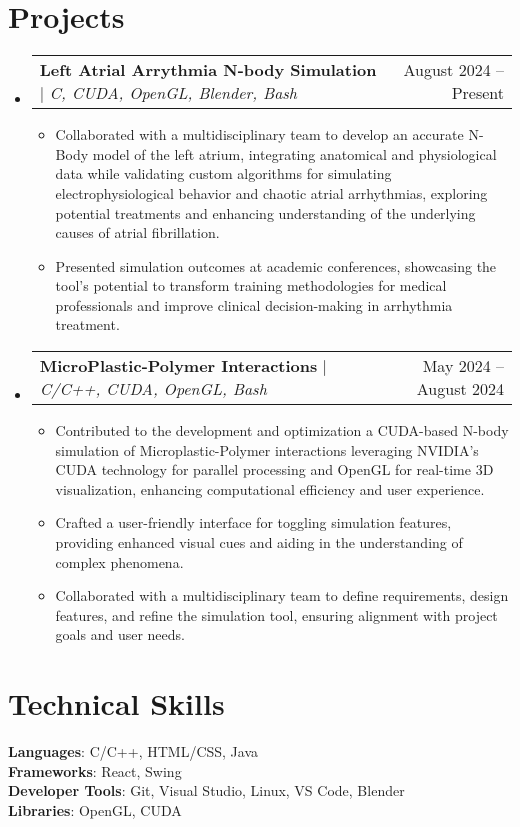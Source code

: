 \documentclass[letterpaper,11pt]{article}
\makeatletter
\newcommand{\resumeItem}[1]{
  \item\small{
    {#1 \vspace{-2pt}}
  }
}
\newcommand{\resumeProjectHeading}[2]{
    \item
    \begin{tabular*}{0.97\textwidth}{l@{\extracolsep{\fill}}r}
      \small#1 & #2 \\
    \end{tabular*}\vspace{-7pt}
}
\newcommand{\resumeSubHeadingListStart}{\begin{itemize}[leftmargin=0.15in, label={}]}
\newcommand{\resumeSubHeadingListEnd}{\end{itemize}}
\newcommand{\resumeItemListStart}{\begin{itemize}}
\newcommand{\resumeItemListEnd}{\end{itemize}\vspace{-5pt}}
\makeatother
\begin{document}
\section{Projects}
    \resumeSubHeadingListStart
      \resumeProjectHeading
          {\textbf{Left Atrial Arrythmia N-body Simulation} $|$ \emph{C, CUDA, OpenGL, Blender, Bash}}{August 2024 -- Present}
          \resumeItemListStart
            \resumeItem{Collaborated with a multidisciplinary team to develop an accurate N-Body model of the left atrium, integrating anatomical and physiological data while validating custom algorithms for simulating electrophysiological behavior and chaotic atrial arrhythmias, exploring potential treatments and enhancing understanding of the underlying causes of atrial fibrillation.}
            \resumeItem{Presented simulation outcomes at academic conferences, showcasing the tool’s potential to transform training methodologies for medical professionals and improve clinical decision-making in arrhythmia treatment.}
          \resumeItemListEnd
      \resumeProjectHeading
          {\textbf{MicroPlastic-Polymer Interactions} $|$ \emph{C/C++, CUDA, OpenGL, Bash}}{May 2024 -- August 2024}
          \resumeItemListStart
            \resumeItem{Contributed to the development and optimization a CUDA-based N-body simulation of Microplastic-Polymer interactions leveraging NVIDIA's CUDA technology for parallel processing and OpenGL for real-time 3D visualization, enhancing computational efficiency and user experience.}
            \resumeItem{Crafted a user-friendly interface for toggling simulation features, providing enhanced visual cues and aiding in the understanding of complex phenomena.}
            \resumeItem{Collaborated with a multidisciplinary team to define requirements, design features, and refine the simulation tool, ensuring alignment with project goals and user needs.}
          \resumeItemListEnd
    \resumeSubHeadingListEnd



%
\section{Technical Skills}
 \begin{itemize}[leftmargin=0.15in, label={}]
    \small{\item{
     \textbf{Languages}{: C/C++, HTML/CSS, Java} \\
     \textbf{Frameworks}{: React, Swing} \\
     \textbf{Developer Tools}{: Git, Visual Studio, Linux, VS Code, Blender} \\
     \textbf{Libraries}{: OpenGL, CUDA}
    }}
 \end{itemize}


\end{document}
